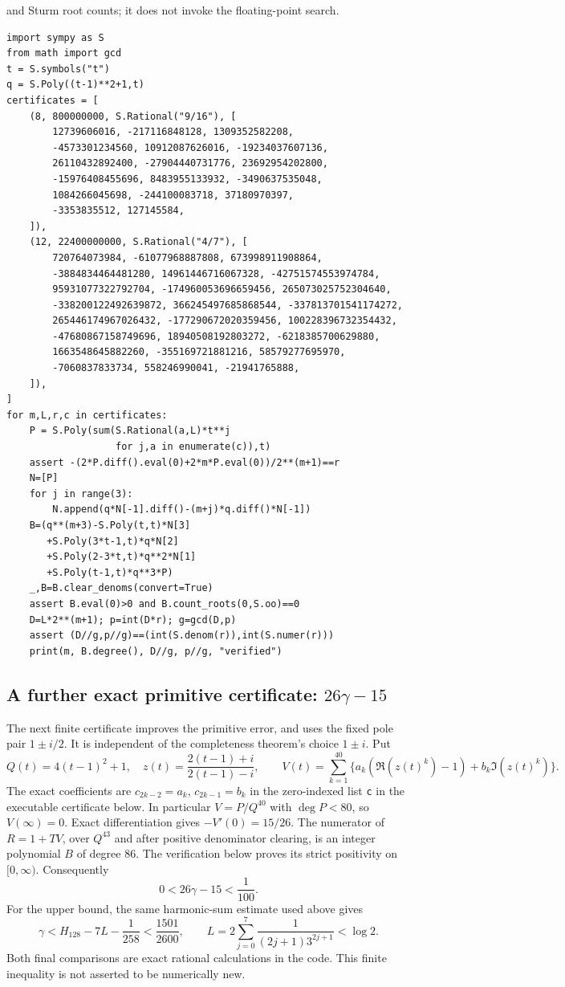 \documentclass[11pt,a4paper]{article}
\theoremstyle{definition}
\theoremstyle{remark}
\numberwithin{equation}{section}
\begin{document}
and Sturm root counts; it does not invoke the floating-point search.
\begin{lstlisting}
import sympy as S
from math import gcd
t = S.symbols("t")
q = S.Poly((t-1)**2+1,t)
certificates = [
    (8, 800000000, S.Rational("9/16"), [
        12739606016, -217116848128, 1309352582208,
        -4573301234560, 10912087626016, -19234037607136,
        26110432892400, -27904440731776, 23692954202800,
        -15976408455696, 8483955133932, -3490637535048,
        1084266045698, -244100083718, 37180970397,
        -3353835512, 127145584,
    ]),
    (12, 22400000000, S.Rational("4/7"), [
        720764073984, -61077968887808, 673998911908864,
        -3884834464481280, 14961446716067328, -42751574553974784,
        95931077322792704, -174960053696659456, 265073025752304640,
        -338200122492639872, 366245497685868544, -337813701541174272,
        265446174967026432, -177290672020359456, 100228396732354432,
        -47680867158749696, 18940508192803272, -6218385700629880,
        1663548645882260, -355169721881216, 58579277695970,
        -7060837833734, 558246990041, -21941765888,
    ]),
]
for m,L,r,c in certificates:
    P = S.Poly(sum(S.Rational(a,L)*t**j
                   for j,a in enumerate(c)),t)
    assert -(2*P.diff().eval(0)+2*m*P.eval(0))/2**(m+1)==r
    N=[P]
    for j in range(3):
        N.append(q*N[-1].diff()-(m+j)*q.diff()*N[-1])
    B=(q**(m+3)-S.Poly(t,t)*N[3]
       +S.Poly(3*t-1,t)*q*N[2]
       +S.Poly(2-3*t,t)*q**2*N[1]
       +S.Poly(t-1,t)*q**3*P)
    _,B=B.clear_denoms(convert=True)
    assert B.eval(0)>0 and B.count_roots(0,S.oo)==0
    D=L*2**(m+1); p=int(D*r); g=gcd(D,p)
    assert (D//g,p//g)==(int(S.denom(r)),int(S.numer(r)))
    print(m, B.degree(), D//g, p//g, "verified")
\end{lstlisting}


\subsection{A further exact primitive certificate: \texorpdfstring{$26\gamma-15$}{26 gamma - 15}}
\label{p6:nk:15-26}
The next finite certificate improves the primitive error, and uses the
fixed pole pair $1\pm i/2$. It is independent of the completeness theorem's
choice $1\pm i$. Put
\[
 Q(t)=4(t-1)^2+1,\quad
 z(t)=\frac{2(t-1)+i}{2(t-1)-i},\qquad
 V(t)=\sum_{k=1}^{40}\{a_k(\Re(z(t)^k)-1)+b_k\Im(z(t)^k)\}.
\]
The exact coefficients are $c_{2k-2}=a_k$, $c_{2k-1}=b_k$ in the
zero-indexed list \texttt{c} in the executable certificate below.
In particular $V=P/Q^{40}$ with $\deg P<80$, so $V(\infty)=0$.
Exact differentiation gives $-V'(0)=15/26$.
The numerator of $R=1+TV$, over $Q^{43}$ and after positive denominator
clearing, is an integer polynomial $B$ of degree $86$.
The verification below proves its strict positivity on $[0,\infty)$.
Consequently
\[
 \boxed{0<26\gamma-15<\frac1{100}.}
\]
For the upper bound, the same harmonic-sum estimate used above gives
\[
 \gamma<H_{128}-7L-\frac1{258}<\frac{1501}{2600},\qquad
 L=2\sum_{j=0}^7\frac1{(2j+1)3^{2j+1}}<\log2.
\]
Both final comparisons are exact rational calculations in the code.
This finite inequality is not asserted to be numerically new.
\end{document}
